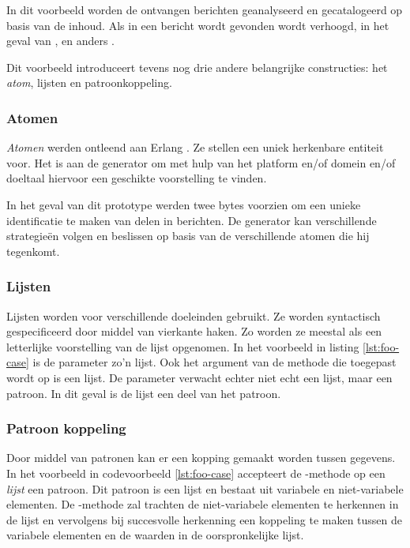 In dit voorbeeld worden de ontvangen berichten geanalyseerd en gecatalogeerd op
basis van de inhoud. Als in een bericht  wordt gevonden wordt
 verhoogd, in het geval van , 
en anders .

Dit voorbeeld introduceert tevens nog drie andere belangrijke constructies: het
\emph{atom}, lijsten en patroonkoppeling.

\vspace{-3mm}

\subsubsection{Atomen}

\emph{Atomen} werden ontleend aan Erlang \citep{armstrong1993concurrent}. Ze
stellen een uniek herkenbare entiteit voor. Het is aan de generator om met hulp
van het platform en/of domein en/of doeltaal hiervoor een geschikte
voorstelling te vinden.

In het geval van dit prototype werden twee bytes voorzien om een unieke
identificatie te maken van delen in berichten. De generator kan verschillende
strategie\"en volgen en beslissen op basis van de verschillende atomen die hij
tegenkomt.

\vspace{-3mm}

\subsubsection{Lijsten}

Lijsten worden voor verschillende doeleinden gebruikt. Ze worden syntactisch
gespecificeerd door middel van vierkante haken. Zo worden ze meestal als een
letterlijke voorstelling van de lijst opgenomen. In het voorbeeld in listing
\ref{lst:foo-case} is de  parameter zo'n lijst. Ook het argument
van de  methode die toegepast wordt op  is een
lijst. De parameter verwacht echter niet echt een lijst, maar een patroon. In
dit geval is de lijst een deel van het patroon.

\vspace{-3mm}

\subsubsection{Patroon koppeling}

Door middel van patronen kan er een kopping gemaakt worden tussen gegevens. In
het voorbeeld in codevoorbeeld \ref{lst:foo-case} accepteert de
-methode op een \emph{lijst} een patroon. Dit patroon is een
lijst en bestaat uit variabele en niet-variabele elementen. De
-methode zal trachten de niet-variabele elementen te herkennen in
de lijst en vervolgens bij succesvolle herkenning een koppeling te maken tussen
de variabele elementen en de waarden in de oorspronkelijke lijst.

